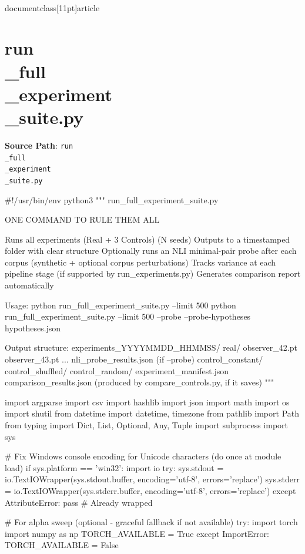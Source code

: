 \\documentclass[11pt]{article}
\begin{document}
\section*{run\\_full\\_experiment\\_suite.py}
\textbf{Source Path}: \texttt{run\\_full\\_experiment\\_suite.py}\par
\bigskip
\begin{CodeBlock}
#!/usr/bin/env python3
"""
run_full_experiment_suite.py

ONE COMMAND TO RULE THEM ALL

Runs all experiments (Real + 3 Controls)  (N seeds)
Outputs to a timestamped folder with clear structure
Optionally runs an NLI minimal-pair probe after each corpus (synthetic + optional corpus perturbations)
Tracks variance at each pipeline stage (if supported by run_experiments.py)
Generates comparison report automatically

Usage:
    python run_full_experiment_suite.py --limit 500
    python run_full_experiment_suite.py --limit 500 --probe --probe-hypotheses hypotheses.json

Output structure:
    experiments_YYYYMMDD_HHMMSS/
        real/
            observer_42.pt
            observer_43.pt
            ...
            nli_probe_results.json           (if --probe)
        control_constant/
        control_shuffled/
        control_random/
        experiment_manifest.json
        comparison_results.json            (produced by compare_controls.py, if it saves)
"""

import argparse
import csv
import hashlib
import json
import math
import os
import shutil
from datetime import datetime, timezone
from pathlib import Path
from typing import Dict, List, Optional, Any, Tuple
import subprocess
import sys

# Fix Windows console encoding for Unicode characters (do once at module load)
if sys.platform == 'win32':
    import io
    try:
        sys.stdout = io.TextIOWrapper(sys.stdout.buffer, encoding='utf-8', errors='replace')
        sys.stderr = io.TextIOWrapper(sys.stderr.buffer, encoding='utf-8', errors='replace')
    except AttributeError:
        pass  # Already wrapped

# For alpha sweep (optional - graceful fallback if not available)
try:
    import torch
    import numpy as np
    TORCH_AVAILABLE = True
except ImportError:
    TORCH_AVAILABLE = False


\end{CodeBlock}
\end{document}
